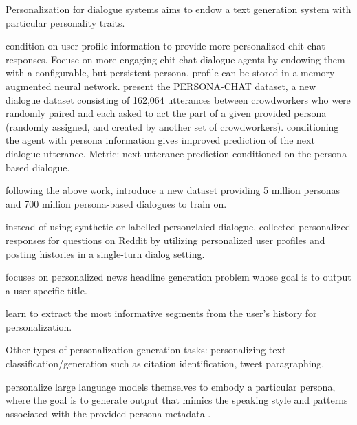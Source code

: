 Personalization for dialogue systems aims to endow a text
generation system with particular personality
traits.

\citet{zhang-etal-2018-personalizing} condition on user profile information to provide more personalized chit-chat responses. Focuse on more engaging chit-chat dialogue agents by endowing
them with a configurable, but persistent persona. profile can be stored in a memory-augmented neural network. present the PERSONA-CHAT dataset, a new dialogue dataset consisting of 162,064 utterances between crowdworkers who were randomly paired
and each asked to act the part of a given provided
persona (randomly assigned, and created by another set of crowdworkers). conditioning the agent with
persona information gives improved prediction of
the next dialogue utterance. Metric: next utterance prediction conditioned on the persona based dialogue. 

\citet{mazare-etal-2018-training} following the above work, introduce a new dataset providing 5 million personas and 700 million persona-based dialogues to train on. 

instead of using synthetic or labelled personzlaied dialogue, \citet{wu-etal-2021-personalized} collected personalized responses for questions on Reddit by utilizing personalized user profiles and posting histories in a single-turn dialog setting. 

\citet{ao-etal-2021-pens} focuses on personalized news headline generation problem whose goal is to output a user-specific title.


\citet{zhong-etal-2022-less} learn to extract the most informative segments from the user's history for personalization.

Other types of personalization generation tasks:
\citet{salemi2023lamp} personalizing text classification/generation such as citation identification, tweet paragraphing.


personalize large language models themselves to embody a particular persona, where the goal is to generate output that mimics the speaking style and patterns associated with the provided persona metadata \citep{vincent2023reference}.
